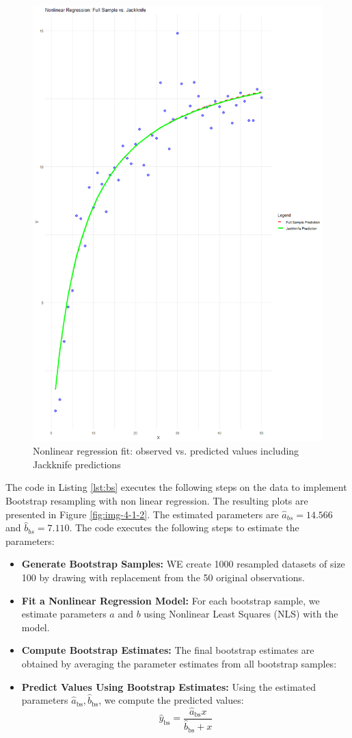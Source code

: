 \documentclass[]{article}
\begin{document}
\begin{figure}[H]
	\centering
	\includegraphics[width=0.7\linewidth]{img/img-4-1-1}
	\caption{Nonlinear regression fit: observed vs. predicted values including Jackknife predictions}
	\label{fig:img-4-1-1}
\end{figure}


The code in Listing \ref{lst:bs} executes the following steps on the data to implement Bootstrap resampling with non linear regression. The resulting plots are presented in Figure \ref{fig:img-4-1-2}. The estimated parameters are $\hat{a}_{bs} = 14.566$ and $\hat{b}_{bs} = 7.110$. The code executes the following steps to estimate the parameters:

\begin{itemize}
	\item \textbf{Generate Bootstrap Samples:}  
	WE create 1000 resampled datasets of size 100 by drawing with replacement from the 50 original observations.
	
	\item \textbf{Fit a Nonlinear Regression Model:}  
	For each bootstrap sample, we estimate parameters $a$ and $b$ using Nonlinear Least Squares (NLS) with the model.
	
	\item \textbf{Compute Bootstrap Estimates:}  
	The final bootstrap estimates are obtained by averaging the parameter estimates from all bootstrap samples:

	\item \textbf{Predict Values Using Bootstrap Estimates:}  
	Using the estimated parameters $\hat{a}_{\text{bs}}, \hat{b}_{\text{bs}}$, we compute the predicted values:
	\begin{equation}
		\hat{y}_{\text{bs}} = \frac{\hat{a}_{\text{bs}} x}{\hat{b}_{\text{bs}} + x}
	\end{equation}
	
\end{itemize}
\end{document}
